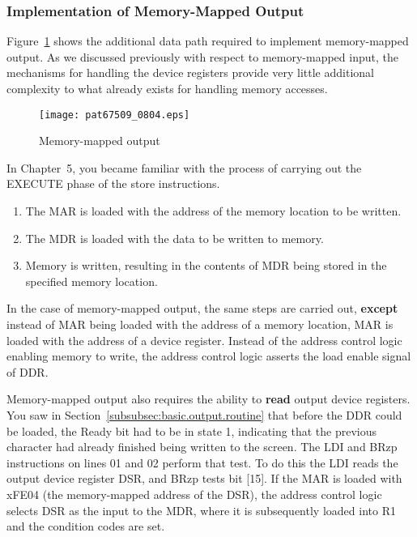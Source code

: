 \documentclass{patt}
\begin{document}
\subsubsection{Implementation of Memory-Mapped Output}

Figure~\ref{fig:memmap.output} shows the additional data path required
to implement memory-mapped output.  As we discussed previously with
respect to memory-mapped input, the mechanisms for handling the device
registers provide very little additional complexity to what already
exists for handling memory accesses.

\begin{figure}[h!]
\centerline{\texttt{[image: pat67509\_0804.eps]}}
\caption{Memory-mapped output}
\label{fig:memmap.output}
\end{figure}


In Chapter~5, you became familiar with the process of carrying out the
EXECUTE phase of the store instructions.

\begin{enumerate}
\item The MAR is loaded with the address of the memory location to be
  written.
\item The MDR is loaded with the data to be written to memory.
\item Memory is written, resulting in the contents of MDR being stored
  in the specified memory location.
\end{enumerate}
In the case of memory-mapped output, the same steps are carried out,
{\bf except} instead of MAR being loaded with the address of a memory
location, MAR is loaded with the address of a device register.
Instead of the {address control logic} enabling memory to write, the
address control logic asserts the load enable signal of DDR.

Memory-mapped output also requires the ability to {\bf read} output
device registers.  You saw in
Section~\ref{subsubsec:basic.output.routine} that before the DDR could
be loaded, the Ready bit had to be in state 1, indicating that the
previous character had already finished being written to the screen.  The LDI
and BRzp instructions on lines 01 and 02 perform that test.  To do
this the LDI reads the output device register DSR, and BRzp tests bit
[15].  If the MAR is loaded with xFE04 (the memory-mapped address of
the DSR), the address control logic selects DSR as the input to the
MDR, where it is subsequently loaded into R1 and the condition codes
are set.

\FloatBarrier
\end{document}

